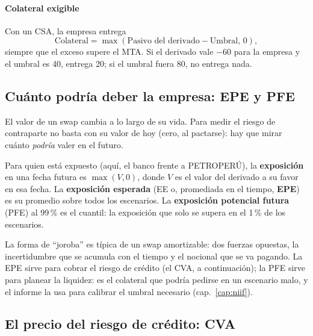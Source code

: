 \paragraph{Colateral exigible} Con un CSA, la empresa entrega
\[ \text{Colateral}=\max(\text{Pasivo del derivado}-\text{Umbral},\,0), \]
siempre que el exceso supere el MTA. Si el derivado vale $-60$ para la empresa y el umbral es 40, entrega 20; si el umbral fuera 80, no entrega nada.

\subsection{Cuánto podría deber la empresa: EPE y PFE}

El valor de un swap cambia a lo largo de su vida. Para medir el riesgo de contraparte no basta con su valor de hoy (cero, al pactarse): hay que mirar cuánto \emph{podría} valer en el futuro.

\begin{definicion}
Para quien está expuesto (aquí, el banco frente a PETROPERÚ), la \textbf{exposición} en una fecha futura es $\max(V,0)$, donde $V$ es el valor del derivado a su favor en esa fecha. La \textbf{exposición esperada} (EE o, promediada en el tiempo, \textbf{EPE}) es su promedio sobre todos los escenarios. La \textbf{exposición potencial futura} (PFE) al 99\,\% es el cuantil: la exposición que solo se supera en el 1\,\% de los escenarios.
\end{definicion}


La forma de \enquote{joroba} es típica de un swap amortizable: dos fuerzas opuestas, la incertidumbre que se acumula con el tiempo y el nocional que se va pagando. La EPE sirve para cobrar el riesgo de crédito (el CVA, a continuación); la PFE sirve para planear la liquidez: es el colateral que podría pedirse en un escenario malo, y el informe la usa para calibrar el umbral necesario (cap.~\ref{cap:niif}).

\subsection{El precio del riesgo de crédito: CVA}

